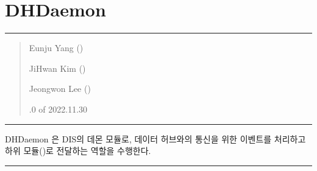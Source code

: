\documentclass[a4paper,10pt,english]{sphinxmanual}
\begin{document}
\section{DHDaemon}
\label{\detokenize{_DHDaemon:dhdaemon}}\label{\detokenize{_DHDaemon:id1}}\label{\detokenize{_DHDaemon::doc}}

\bigskip\hrule\bigskip

\begin{quote}\begin{description}
\begin{DUlineblock}{0em}
\item[] Eunju Yang ()
\item[] JiHwan Kim ()
\item[] Jeongwon Lee ()
\end{DUlineblock}

.0 of 2022.11.30

\end{description}\end{quote}


\bigskip\hrule\bigskip


\sphinxAtStartPar
DHDaemon 은 DIS의 데몬 모듈로, 데이터 허브와의 통신을 위한 이벤트를 처리하고 하위 모듈()로 전달하는 역할을 수행한다.



\bigskip\hrule\bigskip

\end{document}
